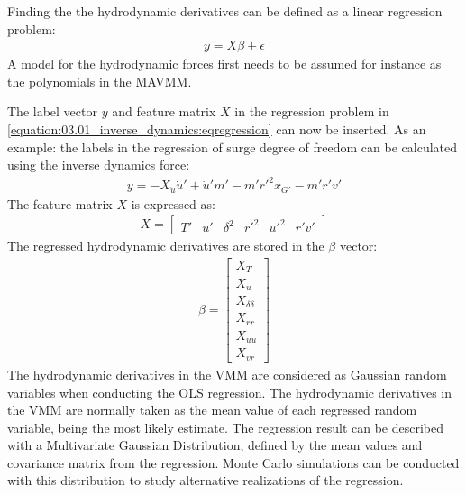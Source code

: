 \documentclass[review]{elsarticle}
\begin{document}
\sphinxAtStartPar
Finding the the hydrodynamic derivatives can be defined as a linear regression problem:
\begin{equation}\label{equation:03.01_inverse_dynamics:eqregression}
\begin{split}y = X\beta + \epsilon\end{split}
\end{equation}
\sphinxAtStartPar
A model for the hydrodynamic forces first needs to be assumed for instance as the polynomials in the MAVMM.

\sphinxAtStartPar
The label vector \(y\) and feature matrix \(X\) in the regression problem in \autoref{equation:03.01_inverse_dynamics:eqregression} can now be inserted. As an example: the labels in the regression of surge degree of freedom can be calculated using the inverse dynamics force:
\begin{equation}\label{equation:03.01_inverse_dynamics:diff_eq_X_y}
\begin{split}\displaystyle y = - X_{\dot{u}} \dot{u}' + \dot{u}' m' - m' r'^{2} x_{G'} - m' r' v'\end{split}
\end{equation}
\sphinxAtStartPar
The feature matrix \(X\) is expressed as:
\begin{equation}\label{equation:03.01_inverse_dynamics:diff_eq_X_X}
\begin{split}\displaystyle X = \left[\begin{matrix}T' & u' & \delta^{2} & r'^{2} & u'^{2} & r' v'\end{matrix}\right]\end{split}
\end{equation}
\sphinxAtStartPar
The regressed hydrodynamic derivatives are stored in the \(\beta\) vector:
\begin{equation}\label{equation:03.01_inverse_dynamics:diff_eq_X_beta}
\begin{split}\displaystyle \beta = \left[\begin{matrix}X_{T}\\X_{u}\\X_{\delta\delta}\\X_{rr}\\X_{uu}\\X_{vr}\end{matrix}\right]\end{split}
\end{equation}
\sphinxAtStartPar
The hydrodynamic derivatives in the VMM are considered as Gaussian random variables when conducting the OLS regression. The hydrodynamic derivatives in the VMM are normally taken as the mean value of each regressed random variable, being the most likely estimate. The regression result can be described with a Multivariate Gaussian Distribution, defined by the mean values and covariance matrix from the regression. Monte Carlo simulations can be conducted with this distribution to study alternative realizations of the regression.
\end{document}
